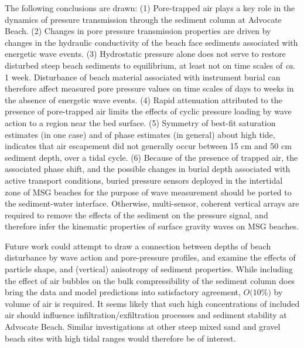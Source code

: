 The following conclusions are drawn: (1) Pore-trapped air plays a key role in the dynamics of pressure transmission through the sediment column at Advocate Beach. (2) Changes in pore pressure transmission properties are driven by changes in the hydraulic conductivity of the beach face sediments associated with energetic wave events. (3) Hydrostatic pressure alone does not serve to restore disturbed steep beach sediments to equilibrium, at least not on time scales of \textit{ca}. 1 week. Disturbance of beach material associated with instrument burial can therefore affect measured pore pressure values on time scales of days to weeks in the absence of energetic wave events. (4) Rapid attenuation attributed to the presence of pore-trapped air limits the effects of cyclic pressure loading by wave action to a region near the bed surface. (5) Symmetry of best-fit saturation estimates (in one case) and of phase estimates (in general) about high tide, indicates that air escapement did not generally occur between 15 cm and 50 cm sediment depth, over a tidal cycle. (6) Because of the presence of trapped air, the associated phase shift, and the possible changes in burial depth associated with active transport conditions, buried pressure sensors deployed in the intertidal zone of MSG beaches for the purpose of wave measurement should be ported to the sediment-water interface. Otherwise, multi-sensor, coherent vertical arrays are required to remove the effects of the sediment on the pressure signal, and therefore infer the kinematic properties of surface gravity waves on MSG beaches. 

Future work could attempt to draw a connection between depths of beach disturbance by wave action and pore-pressure profiles, and examine the effects of particle shape, and (vertical) anisotropy of sediment properties. While including the effect of air bubbles on the bulk compressibility of the sediment column does bring the data and model predictions into satisfactory agreement, $O(10$\%$)$ by volume of air is required. It seems likely that such high concentrations of included air should influence infiltration/exfiltration processes and sediment stability at Advocate Beach. Similar investigations at other steep mixed sand and gravel beach sites with high tidal ranges would therefore be of interest.
















